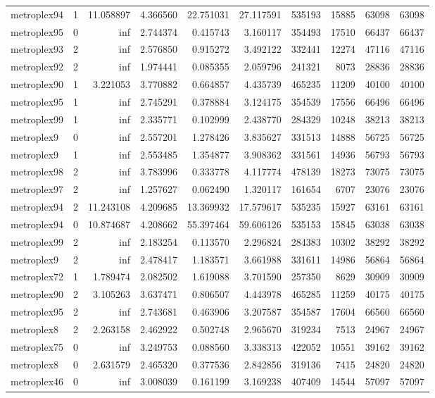 \begin{longtable}{|l|r|r|r|r|r|r|r|r|r|}
metroplex94 & 1 & 11.058897 & 4.366560 & 22.751031 & 27.117591 & 535193 & 15885 & 63098 & 63098 \\
metroplex95 & 0 & inf & 2.744374 & 0.415743 & 3.160117 & 354493 & 17510 & 66437 & 66437 \\
metroplex93 & 2 & inf & 2.576850 & 0.915272 & 3.492122 & 332441 & 12274 & 47116 & 47116 \\
metroplex92 & 2 & inf & 1.974441 & 0.085355 & 2.059796 & 241321 & 8073 & 28836 & 28836 \\
metroplex90 & 1 & 3.221053 & 3.770882 & 0.664857 & 4.435739 & 465235 & 11209 & 40100 & 40100 \\
metroplex95 & 1 & inf & 2.745291 & 0.378884 & 3.124175 & 354539 & 17556 & 66496 & 66496 \\
metroplex99 & 1 & inf & 2.335771 & 0.102999 & 2.438770 & 284329 & 10248 & 38213 & 38213 \\
metroplex9 & 0 & inf & 2.557201 & 1.278426 & 3.835627 & 331513 & 14888 & 56725 & 56725 \\
metroplex9 & 1 & inf & 2.553485 & 1.354877 & 3.908362 & 331561 & 14936 & 56793 & 56793 \\
metroplex98 & 2 & inf & 3.783996 & 0.333778 & 4.117774 & 478139 & 18273 & 73075 & 73075 \\
metroplex97 & 2 & inf & 1.257627 & 0.062490 & 1.320117 & 161654 & 6707 & 23076 & 23076 \\
metroplex94 & 2 & 11.243108 & 4.209685 & 13.369932 & 17.579617 & 535235 & 15927 & 63161 & 63161 \\
metroplex94 & 0 & 10.874687 & 4.208662 & 55.397464 & 59.606126 & 535153 & 15845 & 63038 & 63038 \\
metroplex99 & 2 & inf & 2.183254 & 0.113570 & 2.296824 & 284383 & 10302 & 38292 & 38292 \\
metroplex9 & 2 & inf & 2.478417 & 1.183571 & 3.661988 & 331611 & 14986 & 56864 & 56864 \\
metroplex72 & 1 & 1.789474 & 2.082502 & 1.619088 & 3.701590 & 257350 & 8629 & 30909 & 30909 \\
metroplex90 & 2 & 3.105263 & 3.637471 & 0.806507 & 4.443978 & 465285 & 11259 & 40175 & 40175 \\
metroplex95 & 2 & inf & 2.743681 & 0.463906 & 3.207587 & 354587 & 17604 & 66560 & 66560 \\
metroplex8 & 2 & 2.263158 & 2.462922 & 0.502748 & 2.965670 & 319234 & 7513 & 24967 & 24967 \\
metroplex75 & 0 & inf & 3.249753 & 0.088560 & 3.338313 & 422052 & 10551 & 39162 & 39162 \\
metroplex8 & 0 & 2.631579 & 2.465320 & 0.377536 & 2.842856 & 319136 & 7415 & 24820 & 24820 \\
metroplex46 & 0 & inf & 3.008039 & 0.161199 & 3.169238 & 407409 & 14544 & 57097 & 57097 \\
\end{longtable}

